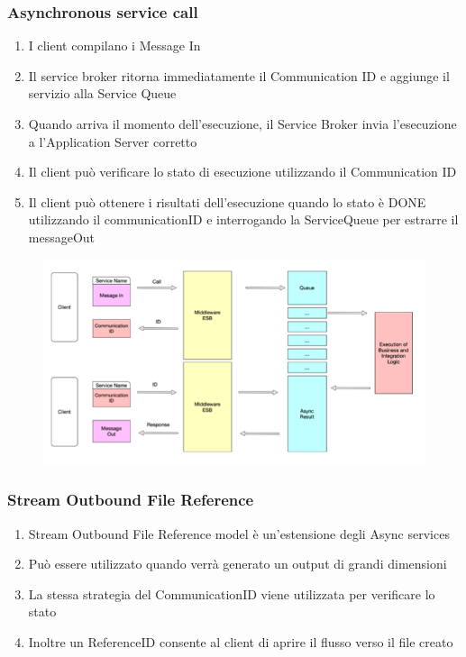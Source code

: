 \documentclass{article}
\begin{document}
\subsubsection{Asynchronous service call}
\begin{enumerate}
    \item I client compilano i Message In
    \item Il service broker ritorna immediatamente il Communication ID e aggiunge il servizio alla Service Queue
    \item Quando arriva il momento dell'esecuzione, il Service Broker invia l'esecuzione a l'Application Server corretto
    \item Il client può verificare lo stato di esecuzione utilizzando il Communication ID
    \item Il client può ottenere i risultati dell'esecuzione quando lo stato è DONE utilizzando il communicationID e interrogando la ServiceQueue per estrarre il messageOut
\end{enumerate}

\begin{figure}[htp]
    \centering
    \includegraphics[width=\linewidth]{fig/asynchronous_service_call.png}
    \label{fig:Asynchronous service call}
\end{figure}

\subsubsection{Stream Outbound File Reference}
\begin{enumerate}
    \item Stream Outbound File Reference model è un'estensione degli Async services
    \item Può essere utilizzato quando verrà generato un output di grandi dimensioni
    \item La stessa strategia del CommunicationID viene utilizzata per verificare lo stato
    \item Inoltre un ReferenceID consente al client di aprire il flusso verso il file creato
\end{enumerate}
\end{document}
